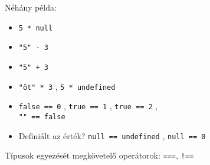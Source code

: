 \begin{frame}
    Néhány példa:
    \begin{itemize}
        \item \texttt{5 * null} 
        \item \texttt{"5" - 3} 
        \item \texttt{"5" + 3} 
        \item \texttt{"öt" * 3} , \texttt{5 * undefined} 
        \item \texttt{false == 0} , \texttt{true == 1} , \texttt{true == 2} , \\ \texttt{"" == false} 
        \item Definiált az érték? \texttt{null == undefined} , \texttt{null == 0} 
    \end{itemize}
    \vfill
    Típusok egyezését megkövetelő operátorok: \texttt{===}, \texttt{!==}
\end{frame}
